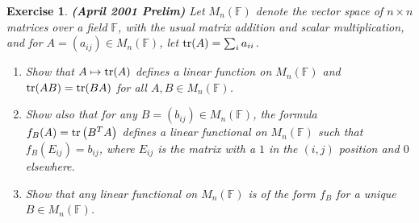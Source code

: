 \documentclass[11pt]{book}
\newtheorem{exercise}{Exercise}[section]
\theoremstyle{definition}
\numberwithin{equation}{chapter}
\begin{document}
\begin{exercise}{\bf (April 2001 Prelim)}
Let $M_n(\mathbb{F})$ denote the vector space of $n \times n$ matrices over a field $\mathbb{F}$, with the usual matrix addition and scalar multiplication, and for $A = \left(a_{ij}\right) \in M_n(\mathbb{F})$, let ${\rm tr}(A) = \sum_i a_{ii}$.
\begin{enumerate}[label=(\alph*)]
    \item Show that $A \mapsto {\rm tr}(A)$ defines a linear function on $M_n(\mathbb{F})$ and ${\rm tr}(AB) = {\rm tr}(BA)$ for all $A, B \in M_n(\mathbb{F})$.
    
    \item Show also that for any $B = \left(b_{ij}\right) \in M_n(\mathbb{F})$, the formula $f_B(A) = {\rm tr}\left(B^T A\right)$ defines a linear functional on $M_n(\mathbb{F})$ such that $f_B(E_{ij}) = b_{ij}$, where $E_{ij}$ is the matrix with a $1$ in the $(i,j)$ position and $0$ elsewhere.
    
    \item Show that any linear functional on $M_n(\mathbb{F})$ is of the form $f_B$ for a unique $B \in M_n(\mathbb{F})$.
\end{enumerate}
\end{exercise}
\end{document}
